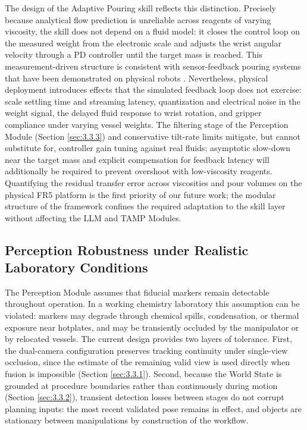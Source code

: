 \documentclass{ieeeaccess}
\begin{document}
The design of the Adaptive Pouring skill reflects this distinction. Precisely because analytical flow prediction is unreliable across reagents of varying viscosity, the skill does not depend on a fluid model: it closes the control loop on the measured weight from the electronic scale and adjusts the wrist angular velocity through a PD controller until the target mass is reached. This measurement-driven structure is consistent with sensor-feedback pouring systems that have been demonstrated on physical robots \cite{ref21, ref22}. Nevertheless, physical deployment introduces effects that the simulated feedback loop does not exercise: scale settling time and streaming latency, quantization and electrical noise in the weight signal, the delayed fluid response to wrist rotation, and gripper compliance under varying vessel weights. The filtering stage of the Perception Module (Section \ref{sec:3.3.3}) and conservative tilt-rate limits mitigate, but cannot substitute for, controller gain tuning against real fluids; asymptotic slow-down near the target mass and explicit compensation for feedback latency will additionally be required to prevent overshoot with low-viscosity reagents. Quantifying the residual transfer error across viscosities and pour volumes on the physical FR5 platform is the first priority of our future work; the modular structure of the framework confines the required adaptation to the skill layer without affecting the LLM and TAMP Modules.

\subsection{Perception Robustness under Realistic Laboratory Conditions}\label{sec:5.2}
The Perception Module assumes that fiducial markers remain detectable throughout operation. In a working chemistry laboratory this assumption can be violated: markers may degrade through chemical spills, condensation, or thermal exposure near hotplates, and may be transiently occluded by the manipulator or by relocated vessels. The current design provides two layers of tolerance. First, the dual-camera configuration preserves tracking continuity under single-view occlusion, since the estimate of the remaining valid view is used directly when fusion is impossible (Section \ref{sec:3.3.1}). Second, because the World State is grounded at procedure boundaries rather than continuously during motion (Section \ref{sec:3.3.2}), transient detection losses between stages do not corrupt planning inputs: the most recent validated pose remains in effect, and objects are stationary between manipulations by construction of the workflow.
\end{document}
